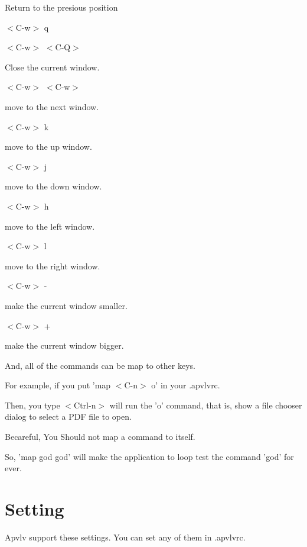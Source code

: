 \documentclass[a4paper,12pt]{article}
\begin{document}
\begin{description}
Return to the presious position

\item $<$C-w$>$ q
\item $<$C-w$>$ $<$C-Q$>$

Close the current window.

\item $<$C-w$>$ $<$C-w$>$

move to the next window.

\item $<$C-w$>$ k

move to the up window.

\item $<$C-w$>$ j

move to the down window.

\item $<$C-w$>$ h

move to the left window.

\item $<$C-w$>$ l

move to the right window.

\item $<$C-w$>$ -

make the current window smaller.

\item $<$C-w$>$ +

make the current window bigger.

\end{description}

And, all of the commands can be map to other keys.

For example, if you put 
'map $<$C-n$>$ o'
in your .apvlvrc.

Then, you type $<$Ctrl-n$>$ will run the 'o' command, that is, show a file chooser dialog to select a PDF file to open.

Becareful, You Should not map a command to itself.

So, 'map god god' will make the application to loop test the command 'god' for ever.

\newpage

\section{Setting}

Apvlv support these settings. You can set any of them in .apvlvrc.
\end{document}
